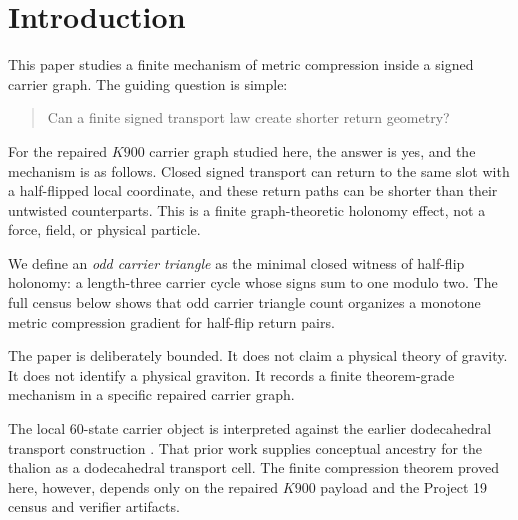 \section{Introduction}

This paper studies a finite mechanism of metric compression inside a signed carrier graph. The guiding question is simple:

\begin{quote}
Can a finite signed transport law create shorter return geometry?
\end{quote}

For the repaired \(K900\) carrier graph studied here, the answer is yes, and the mechanism is as follows. Closed signed transport can return to the same slot with a half-flipped local coordinate, and these return paths can be shorter than their untwisted counterparts. This is a finite graph-theoretic holonomy effect, not a force, field, or physical particle.

We define an \emph{odd carrier triangle} as the minimal closed witness of half-flip holonomy: a length-three carrier cycle whose signs sum to one modulo two. The full census below shows that odd carrier triangle count organizes a monotone metric compression gradient for half-flip return pairs.

The paper is deliberately bounded. It does not claim a physical theory of gravity. It does not identify a physical graviton. It records a finite theorem-grade mechanism in a specific repaired carrier graph.

The local 60-state carrier object is interpreted against the earlier dodecahedral transport construction \cite{cave2026dodecahedraltransport}. That prior work supplies conceptual ancestry for the thalion as a dodecahedral transport cell. The finite compression theorem proved here, however, depends only on the repaired \(K900\) payload and the Project 19 census and verifier artifacts.
